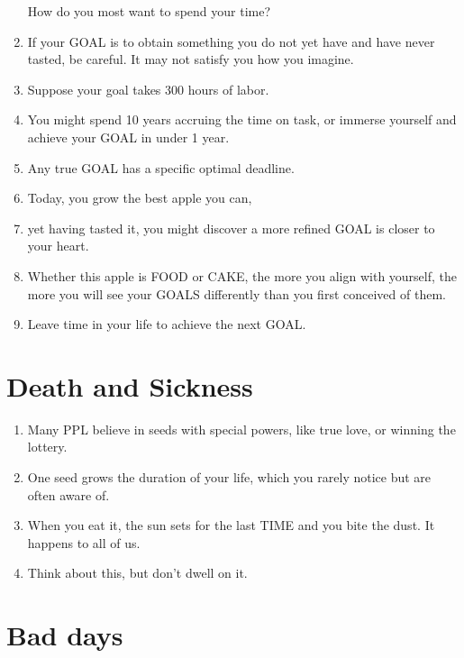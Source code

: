 \documentclass[
]{book}
\providecommand{\tightlist}{%
  \setlength{\itemsep}{0pt}\setlength{\parskip}{0pt}}
\begin{document}
\begin{enumerate}
  How do you most want to spend your time?
\item
  If your GOAL is to obtain something you do not yet have and have never
  tasted, be careful. It may not satisfy you how you imagine.
\item
  Suppose your goal takes 300 hours of labor.
\item
  You might spend 10 years accruing the time on task, or immerse yourself
  and achieve your GOAL in under 1 year.
\item
  Any true GOAL has a specific optimal deadline.
\item
  Today, you grow the best apple you can,
\item
  yet having tasted it, you might discover a more refined GOAL is closer to
  your heart.
\item
  Whether this apple is FOOD or CAKE, the more you align with yourself, the
  more you will see your GOALS differently than you first conceived of them.
\item
  Leave time in your life to achieve the next GOAL.
\end{enumerate}

\hypertarget{death-and-sickness}{%
\section{Death and Sickness}\label{death-and-sickness}}

\begin{enumerate}
\def\labelenumi{\arabic{enumi}.}
\setcounter{enumi}{18}
\tightlist
\item
  Many PPL believe in seeds with special powers, like true love, or winning the
  lottery.
\item
  One seed grows the duration of your life, which you rarely notice but are often
  aware of.
\item
  When you eat it, the sun sets for the last TIME and you bite the dust. It happens
  to all of us.
\item
  Think about this, but don't dwell on it.
\end{enumerate}

\hypertarget{bad-days}{%
\section{Bad days}\label{bad-days}}
\end{document}
